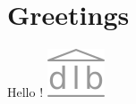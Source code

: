 \documentclass{article}
\begin{document}
    \tableofcontents

    \section{Greetings}
    Hello !
    \includegraphics[height=2ex]{logo}
\end{document}

